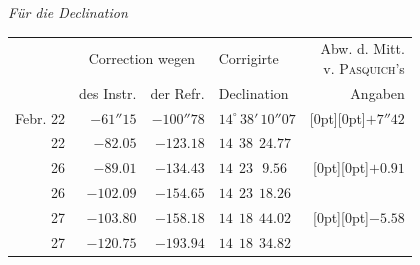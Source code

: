\begin{center}\footnotesize\setlength{\tabcolsep}{4pt}
\emph{Für die Declination}
\end{center}

\begin{center}\footnotesize\setlength{\tabcolsep}{4pt}
\begin{tabular}{r|r|r|l|r}
 & \multicolumn{2}{c|}{Correction wegen} & Corrigirte & \shortstack{Abw. d. Mitt.\\v. \textsc{Pasquich}'s}\\
 & des Instr. & der Refr. & Declination & Angaben \\
\hline
Febr. 22 & $-61''15$ & $-100''78$ & $14^\circ\,38'\,10''07$ & \raisebox{-5.5pt}[0pt][0pt]{$+7''42$} \\
22 & $-82.05$ & $-123.18$ & $14\ \ 38\ \ 24.77$ & \\
26 & $-89.01$ & $-134.43$ & $14\ \ 23\ \ \ 9.56$ & \raisebox{-5.5pt}[0pt][0pt]{$+0.91$} \\
26 & $-102.09$ & $-154.65$ & $14\ \ 23\ \ 18.26$ & \\
27 & $-103.80$ & $-158.18$ & $14\ \ 18\ \ 44.02$ & \raisebox{-5.5pt}[0pt][0pt]{$-5.58$} \\
27 & $-120.75$ & $-193.94$ & $14\ \ 18\ \ 34.82$ & \\
\end{tabular}
\end{center}

